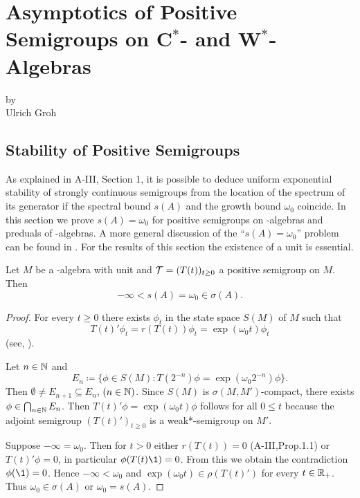 \chapter{Asymptotics of Positive Semigroups on \texorpdfstring{C$^{*}$}{C*}- and \texorpdfstring{W$^{*}$}{W*}-Algebras}\label{chap:d4}
{\Large
\vspace*{-.75cm}
by \\[.25em]
Ulrich Groh
\vspace{.75cm}
\\
}
\section{Stability of Positive Semigroups}\label{sec:d4-1}
As explained in A-III, Section 1, it is possible to deduce uniform exponential stability of strongly continuous semigroups from the location of the spectrum of its generator if the spectral bound $ s(A) $ and the growth bound $ \omega_{0} $ coincide.
In this section we prove $s(A) = \omega_{0}$ for positive semigroups on \CA-algebras and preduals of \WA-algebras.
A more general discussion of the \enquote{$s(A) = \omega_{0}$} problem can be found in \citet{greinervoigtwolff:1981}.
For the results of this section the existence of a unit is essential.
\begin{theorem}\label{thm:d4-1.1}
Let $M$ be a \CA-algebra with unit and $\mathcal{T} = (T(t))_{t \geq 0}$ a positive semigroup on $M$.
Then
\[
	-\infty < s(A) = \omega_{0} \in \sigma(A).
\]
\end{theorem}
\begin{proof}
For every  $t \geq 0 $ there exists $\phi_{t}$ in the state space $S(M)$ of $M$ such that
\[
	T(t)'\phi_{t} = r(T(t))\phi_{t} = \exp(\omega_{0} t)\phi_{t}
\]
(see, \eg \citet[2.1]{groh:1981}).

Let $n \in \mathbb{N}$ and
\[
	E_{n} \coloneqq \{\phi \in S(M) \colon T(2^{-n})\phi = \exp(\omega_{0} 2^{-n})\phi \}.
\]
Then $\emptyset \neq E_{n+1} \subseteq E_{n}$,  $(n \in \mathbb{N})$.
Since $S(M)$ is $\sigma(M,M')$-compact, there exists $\phi \in \bigcap_{n \in \mathbb{N}} E_{n}$.
Then $ T(t)'\phi = \exp(\omega_{0} t)\phi$ follows for all $ 0 \leq t $ because the adjoint semigroup $(T(t)')_{t \geq 0}$ is a weak*-semigroup on $M'$.

Suppose $-\infty = \omega_{0}$.
Then for $t > 0$ either $r(T(t)) = 0$ (A-III,Prop.1.1) or $T(t)'\phi = 0$, in particular $\phi(T(t)\1) = 0$.
From this we obtain the contradiction $\phi(\1) = 0$.
Hence $-\infty < \omega_{0}$ and $\exp(\omega_{0} t) \in \rho(T(t)')$ for every $t \in \mathbb{R}_{+}$.
Thus $\omega_{0} \in \sigma(A)$ or $\omega_{0} = s(A)$.
\end{proof}
